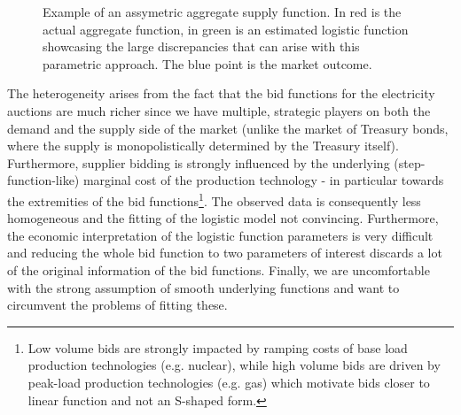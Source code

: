 \begin{figure}[!ht]
\begin{center}  \end{center}
\caption{Example of an assymetric aggregate supply function. In red is the actual aggregate function, in green is an estimated logistic function showcasing the large discrepancies that can arise with this parametric approach. The blue point is the market outcome. }
\label{assymetry}
\end{figure}

The heterogeneity arises from the fact that the bid functions for the electricity auctions are much richer since we have multiple, strategic players on both the demand and the supply side of the market (unlike the market of Treasury bonds, where the supply is monopolistically determined by the Treasury itself). Furthermore, supplier bidding is strongly influenced by the underlying (step-function-like) marginal cost of the production technology - in particular towards the extremities of the bid functions\footnote{Low volume bids are strongly impacted by ramping costs of base load production technologies (e.g. nuclear), while high volume bids are driven by peak-load production technologies (e.g. gas) which motivate bids closer to linear function and not an S-shaped form.}. The observed data is consequently less homogeneous and the fitting of the logistic model not convincing.
Furthermore, the economic interpretation of the logistic function parameters is very difficult and reducing the whole bid function to two parameters of interest discards a lot of the original information of the bid functions. Finally, we are uncomfortable with the strong assumption of smooth underlying functions and want to circumvent the problems of fitting these. 


